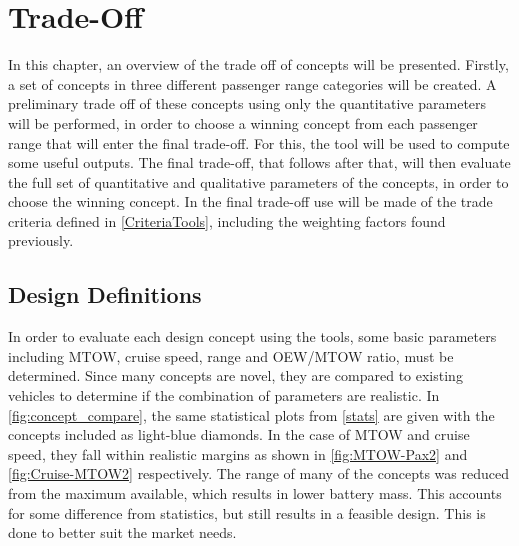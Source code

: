 \newpage
\chapter{Trade-Off}
\label{ch-tradeoff}


In this chapter, an overview of the trade off of concepts will be presented. Firstly, a set of concepts in three different passenger range categories will be created. A preliminary trade off of these concepts using only the quantitative parameters will be performed, in order to choose a winning concept from each passenger range that will enter the final trade-off. For this, the tool will be used to compute some useful outputs. The final trade-off, that follows after that, will then evaluate the full set of quantitative and qualitative parameters of the concepts, in order to choose the winning concept. In the final trade-off use will be made of the trade criteria defined in \autoref{CriteriaTools}, including the weighting factors found previously. 

\section{Design Definitions}
In order to evaluate each design concept using the tools, some basic parameters including MTOW, cruise speed, range and OEW/MTOW ratio, must be determined. Since many concepts are novel, they are compared to existing vehicles to determine if the combination of parameters are realistic. In \autoref{fig:concept_compare}, the same statistical plots from \autoref{stats} are given with the concepts included as light-blue diamonds. In the case of MTOW and cruise speed, they fall within realistic margins as shown in \autoref{fig:MTOW-Pax2} and \autoref{fig:Cruise-MTOW2} respectively. The range of many of the concepts was reduced from the maximum available, which results in lower battery mass. This accounts for some difference from statistics, but still results in a feasible design. This is done to better suit the market needs.

